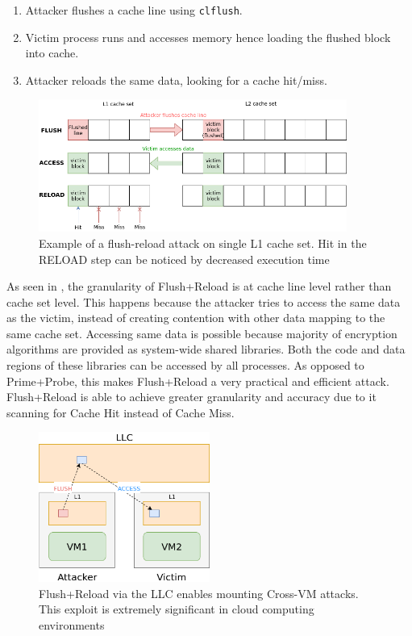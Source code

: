 \begin{enumerate}
\item Attacker flushes a cache line using \texttt{clflush}.
\item Victim process runs and accesses memory hence loading the flushed block into cache.
\item Attacker reloads the same data, looking for a cache hit/miss.
\end{enumerate}

\begin{figure}[h]
\includegraphics[width=0.9\textwidth]{flush_reload}
\caption[Flush Reload attack]{Example of a flush-reload attack on single L1 cache set. Hit in the RELOAD step can be noticed by decreased execution time}
\label{fig:fr}
\end{figure}

As seen in , the granularity of Flush+Reload is at cache line level rather than cache set level.
This happens because the attacker tries to access the same data as the victim, instead of creating contention with
other data mapping to the same cache set. Accessing same data is possible because majority of encryption algorithms
are provided as system-wide shared libraries. Both the code and data regions of these libraries can be accessed by all
processes. As opposed to Prime+Probe, this makes Flush+Reload a very practical and efficient attack.
Flush+Reload is able to achieve greater granularity and accuracy due to it scanning for Cache Hit instead of Cache Miss.

\begin{figure}[h]
\centering
\includegraphics[width=0.5\textwidth]{flush_reload_crossvm}
\caption[Cross-VM Flush+Reload]{Flush+Reload via the LLC enables mounting Cross-VM attacks. This exploit is extremely significant in cloud computing environments}
\label{fig:crossvm}
\end{figure}

